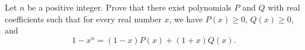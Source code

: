 Let $n$ be a positive integer. Prove that there exist polynomials $P$ and $Q$ with real coefficients such that for every real number $x$, we have $P\left(x\right)\geq0$, $Q\left(x\right)\geq0$, and \[1-x^n=\left(1-x\right)P\left(x\right)+\left(1+x\right)Q\left(x\right).\]
